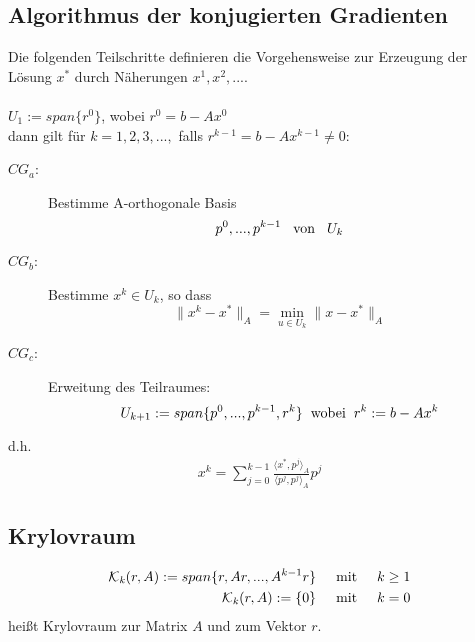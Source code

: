 \documentclass{article}
\begin{document}
\subsection*{Algorithmus der konjugierten Gradienten}
Die folgenden Teilschritte definieren die Vorgehensweise zur Erzeugung der Lösung $x^{*}$ durch Näherungen $x^{1}, x^{2},...$.
\\\\$U_{1} := span\{r^{0}\}$, wobei $r^{0} = b - Ax^{0}$
\\dann gilt für $k = 1,2,3,...,$ falls $r^{k-1} = b - Ax^{k-1} \ne 0$:
\begin{description}
\item[$CG_{a}$:] Bestimme A-orthogonale Basis
\begin{equation}
p^{0},...,p^{k-1} \hspace{3mm} \textnormal{von} \hspace{3mm} U_{k}
\end{equation}
\item[$CG_{b}$:] Bestimme $x^{k} \in U_{k}$, so dass
\begin{equation}
\|x^{k} - x^{*}\|_{A} = \underset{u \in U_{k}}{\min} \|x - x^{*}\|_{A}
\end{equation}
\item[$CG_{c}$:] Erweitung des Teilraumes:
\begin{equation}
U_{k+1} := span\{p^{0},...,p^{k-1},r^{k}\} \hspace{2mm} \textnormal{wobei} \hspace{2mm} r^{k} := b - Ax^{k}
\end{equation}
\end{description}
d.h.
\begin{align}
x^{k} = \sum_{j=0}^{k-1} \frac {\langle x^{*}, p^{j} \rangle _{A}} {\langle p^{j}, p^{j} \rangle _{A}} p^{j}
\end{align}

\subsection*{Krylovraum}
\begin{align*}
\mathcal{K}_{\mathit{k}}(r, A) := span\{r, Ar, ..., A^{k-1}r\} \hspace{5mm} \textnormal{mit} \hspace{5mm} k \ge 1\\
\mathcal{K}_{\mathit{k}}(r, A) := \{0\} \hspace{5mm} \textnormal{mit} \hspace{5mm} k = 0
\end{align*}
heißt Krylovraum zur Matrix $A$ und zum Vektor $r$.
\end{document}
